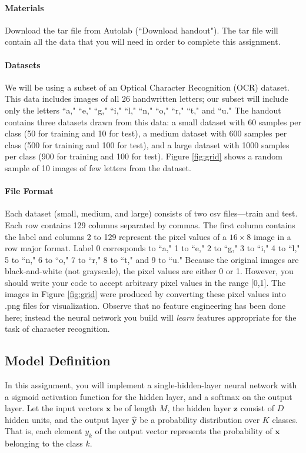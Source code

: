 \documentclass[11pt]{article}
\numberwithin{equation}{section} %
\numberwithin{figure}{section} %
\numberwithin{table}{section} %
\newcommand{\ntset}{test}
\newcommand{\xv}{\mathbf{x}}
\newcommand{\yv}{\mathbf{y}}
\newcommand{\zv}{\mathbf{z}}
\begin{document}
\paragraph{Materials} Download the tar file from Autolab (``Download
  handout"). The tar file will contain all the data that you will need
  in order to complete this assignment.

\paragraph{Datasets} We will be using a subset of an Optical Character Recognition (OCR) dataset. This data includes images of all 26 handwritten letters; our subset will include only the letters ``a," ``e," ``g," ``i," ``l," ``n," ``o," ``r," ``t," and ``u."  The handout contains three datasets drawn from this data: a small dataset with 60 samples per class (50 for training and 10 for \ntset), a medium dataset with 600 samples per class (500 for training and 100 for \ntset), and a large dataset with 1000 samples per class (900 for training and 100 for \ntset). Figure \ref{fig:grid} shows a random sample of 10 images of few letters from the dataset.

\paragraph{File Format} Each dataset (small, medium, and large) consists of two csv files---train and \ntset. Each row contains 129 columns separated by commas. The first column contains the label and columns 2 to 129 represent the pixel values of a $16 \times 8$ image in a row major format. Label 0 corresponds to ``a," 1 to ``e," 2 to ``g," 3 to ``i," 4 to ``l," 5 to ``n," 6 to ``o," 7 to ``r," 8 to ``t," and 9 to ``u."
%
Because the original images are black-and-white (not grayscale), the pixel values are either 0 or 1. However, you should write your code to accept arbitrary pixel values in the range [0,1]. The images in Figure \ref{fig:grid} were produced by converting these pixel values into .png files for visualization. Observe that no feature engineering has been done here; instead the neural network you build will \emph{learn} features appropriate for the task of character recognition.


\subsection{Model Definition}

In this assignment, you will implement a single-hidden-layer neural network with a sigmoid activation function for the hidden layer, and a softmax on the output layer. Let the input vectors $\xv$ be of length $M$, the hidden layer $\zv$ consist of $D$ hidden units, and the output layer $\hat{\yv}$ be a probability distribution over $K$ classes. That is, each element $y_k$ of the output vector represents the probability of $\xv$ belonging to the class $k$. 
\end{document}
